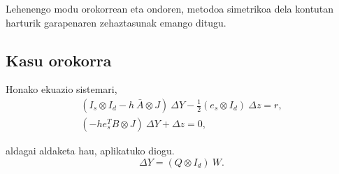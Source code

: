 Lehenengo modu orokorrean eta ondoren, metodoa simetrikoa dela kontutan harturik garapenaren zehaztasunak emango ditugu.

\subsection*{Kasu orokorra}
\label{serans:B31}

Honako ekuazio sistemari,
\begin{align}
\label{eqA3:2}
(I_s \otimes I_d- h \ \bar{A} \otimes J) \ \Delta Y - \frac{1}{2}(e_s \otimes I_d) \ \Delta z =r,\\
(-h e_s^T B \otimes J) \ \Delta Y+  \Delta z=0,
\end{align}

aldagai aldaketa hau,  aplikatuko diogu.
\begin{equation}
\label{eqA3:3}
 \Delta Y = (Q \otimes I_d) \ W.
\end{equation}

